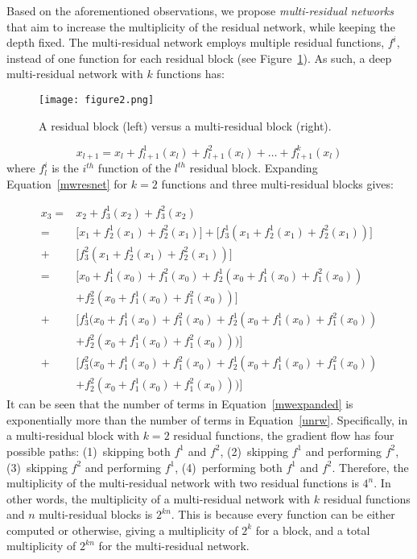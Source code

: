\documentclass[journal]{IEEEtran}
\begin{document}
Based on the aforementioned observations, we propose \textit{multi-residual networks} that aim to increase the multiplicity of the residual network, while keeping the depth fixed. The multi-residual network employs multiple residual functions, $f^i$, instead of one function for each residual block (see Figure~\ref{fig:resblock}). As such, a deep multi-residual network with $k$ functions has:


\begin{figure}
\centering
\texttt{[image: figure2.png]}
\caption{A residual block (left) versus a multi-residual block (right).}
\label{fig:resblock}
\end{figure}

\begin{equation}\label{mwresnet}
x_{l+1} = x_l+ f_{l+1}^1(x_l) + f_{l+1}^2 (x_l) + \dots + f_{l+1}^k(x_l)
\end{equation}
where $f^i_l$ is the $i^{th}$ function of the $l^{th}$ residual block. Expanding Equation~\ref{mwresnet} for $k=2$ functions and three multi-residual blocks gives:


\begin{equation}\label{mwexpanded}
\begin{split}
x_3 =& x_2 + f_3^1(x_2) + f_3^2(x_2) \\
    =& \Big[ x_1 + f_2^1(x_1) + f_2^2(x_1)\Big] + \Big[f_3^1(x_1 + f_2^1(x_1) + f_2^2(x_1))\Big] \\
    +& \Big[f_3^2(x_1 + f_2^1(x_1) + f_2^2(x_1))\Big]\\
    =& \Big[ x_0 + f_1^1(x_0) + f_1^2(x_0)+ f_2^1(x_0+f_1^1(x_0)+f_1^2(x_0))\\
    & +f_2^2(x_0+f_1^1(x_0)+f_1^2(x_0))\Big] \\
    +& \Big[f_3^1(x_0 + f_1^1(x_0)+ f_1^2(x_0)+f_2^1(x_0 + f_1^1(x_0)+ f_1^2(x_0)) \\
    &+ f_2^2(x_0 + f_1^1(x_0)+ f_1^2(x_0))) \Big]  \\
    +& \Big[f_3^2(x_0 + f_1^1(x_0)+ f_1^2(x_0)+f_2^1(x_0 + f_1^1(x_0)+ f_1^2(x_0)) \\
    &+ f_2^2(x_0 + f_1^1(x_0)+ f_1^2(x_0))) \Big] 
\end{split}
\end{equation}
It can be seen that the number of terms in Equation~\ref{mwexpanded} is exponentially more than the number of terms in Equation~\ref{unrw}. Specifically, in a multi-residual block with $k=2$ residual functions, the gradient flow has four possible paths: (1)~skipping both $f^1$ and $f^2$, (2)~skipping $f^1$ and performing $f^2$, (3)~skipping $f^2$ and performing $f^1$, (4)~performing both $f^1$ and $f^2$. Therefore, the multiplicity of the multi-residual network with two residual functions is $4^n$. In other words, the multiplicity of a multi-residual network with $k$ residual functions and $n$ multi-residual blocks is $2^{kn}$. This is because every function can be either computed or otherwise, giving a multiplicity of $2^k$ for a block, and a total multiplicity of $2^{kn}$ for the multi-residual network.
\end{document}
